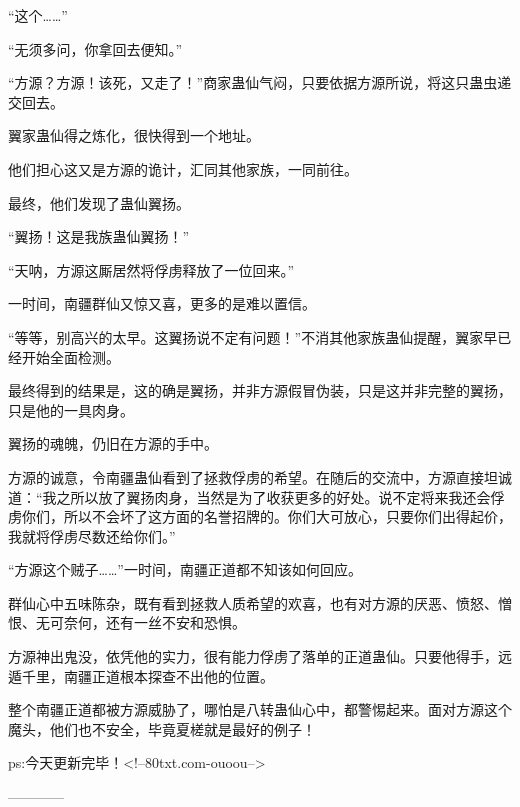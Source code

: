 \begin{this_body}
“这个……”

“无须多问，你拿回去便知。”

“方源？方源！该死，又走了！”商家蛊仙气闷，只要依据方源所说，将这只蛊虫递交回去。

翼家蛊仙得之炼化，很快得到一个地址。

他们担心这又是方源的诡计，汇同其他家族，一同前往。

最终，他们发现了蛊仙翼扬。

“翼扬！这是我族蛊仙翼扬！”

“天呐，方源这厮居然将俘虏释放了一位回来。”

一时间，南疆群仙又惊又喜，更多的是难以置信。

“等等，别高兴的太早。这翼扬说不定有问题！”不消其他家族蛊仙提醒，翼家早已经开始全面检测。

最终得到的结果是，这的确是翼扬，并非方源假冒伪装，只是这并非完整的翼扬，只是他的一具肉身。

翼扬的魂魄，仍旧在方源的手中。

方源的诚意，令南疆蛊仙看到了拯救俘虏的希望。在随后的交流中，方源直接坦诚道：“我之所以放了翼扬肉身，当然是为了收获更多的好处。说不定将来我还会俘虏你们，所以不会坏了这方面的名誉招牌的。你们大可放心，只要你们出得起价，我就将俘虏尽数还给你们。”

“方源这个贼子……”一时间，南疆正道都不知该如何回应。

群仙心中五味陈杂，既有看到拯救人质希望的欢喜，也有对方源的厌恶、愤怒、憎恨、无可奈何，还有一丝不安和恐惧。

方源神出鬼没，依凭他的实力，很有能力俘虏了落单的正道蛊仙。只要他得手，远遁千里，南疆正道根本探查不出他的位置。

整个南疆正道都被方源威胁了，哪怕是八转蛊仙心中，都警惕起来。面对方源这个魔头，他们也不安全，毕竟夏槎就是最好的例子！

ps:今天更新完毕！<!--80txt.com-ouoou-->

------------

\end{this_body}

